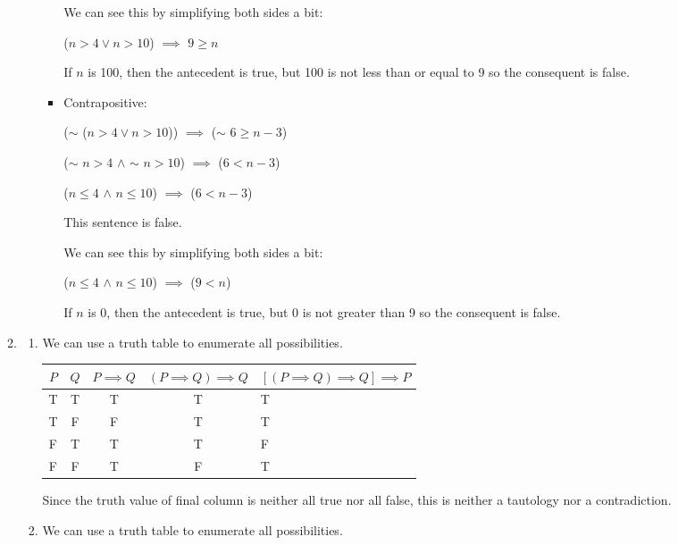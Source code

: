 \documentclass[12pt,letterpaper]{article}
\begin{document}
\begin{enumerate}
\begin{enumerate}
\begin{enumerate}
\begin{itemize}
                  We can see this by simplifying both sides a bit:

                  ($n > 4 \lor n > 10$) $\implies$ $9 \geq n$

                  If $n$ is 100, then the antecedent is true,
                  but 100 is not less than or equal to 9 so the consequent is false.

                \item Contrapositive:

                  ($\sim$ ($n > 4 \lor n > 10$)) $\implies$ ($\sim$ $6 \geq n - 3$)

                  ($\sim$ $n > 4$ $\land$ $\sim$ $n > 10$) $\implies$ ($6 < n - 3$)

                  ($n \leq 4$ $\land$ $n \leq 10$) $\implies$ ($6 < n - 3$)

                  This sentence is false.

                  We can see this by simplifying both sides a bit:

                  ($n \leq 4$ $\land$ $n \leq 10$) $\implies$ ($9 < n$)

                  If $n$ is 0, then the antecedent is true,
                  but 0 is not greater than 9 so the consequent is false.
              \end{itemize}
          \end{enumerate}
        \item
          \begin{enumerate}
            \item
              We can use a truth table to enumerate all possibilities.

              \begin{tabular}{c | c | c | c | g}
                $P$ & $Q$ & $P \implies Q$ & $(P \implies Q) \implies Q$ & $[(P \implies Q) \implies Q] \implies P$ \\
                \hline
                T & T & T & T & T \\
                T & F & F & T & T \\
                F & T & T & T & F \\
                F & F & T & F & T \\
              \end{tabular}

              Since the truth value of final column is neither all true nor all false,
              this is neither a tautology nor a contradiction.
            \item
              We can use a truth table to enumerate all possibilities.


\end{enumerate}
\end{enumerate}
\end{enumerate}
\end{document}
